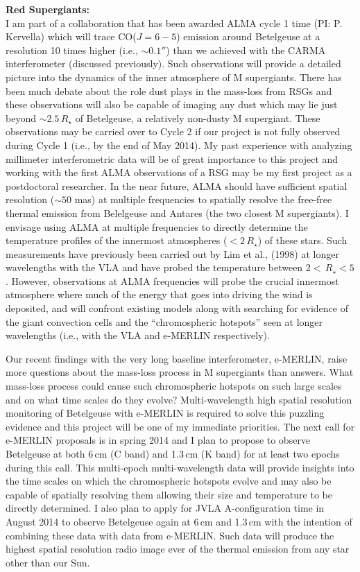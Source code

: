 \documentclass[11pt]{letter} %
\begin{document}
\textbf{Red Supergiants:}\\
I am part of a collaboration that has been awarded ALMA cycle 1 time (PI: P. Kervella) which will trace CO($J=6-5$) emission around Betelgeuse at a resolution 10 times higher (i.e., $\sim 0.1''$) than we achieved with the CARMA interferometer (discussed previously). Such observations will provide a detailed picture into the dynamics of the inner atmosphere of M supergiants. There has been much debate about the role dust plays in the mass-loss from RSGs and these observations will also be capable of imaging any dust which may lie just beyond $\sim 2.5\,R_{\star}$ of Betelgeuse, a relatively non-dusty M supergiant. These observations may be carried over to Cycle 2 if our project is not fully observed during Cycle 1 (i.e., by the end of May 2014). My past experience with analyzing millimeter interferometric data will be of great importance to this project and working with the first ALMA observations of a RSG may be my first project as a postdoctoral researcher. In the near future, ALMA should have sufficient spatial resolution ($\sim 50$ mas) at multiple frequencies to spatially resolve the free-free thermal emission from Belelgeuse and Antares (the two closest M supergiants). I envisage using ALMA at multiple frequencies to directly determine the temperature profiles of the  innermost atmospheres ($<2\,R_{\star}$) of these stars. Such measurements have previously been carried out by Lim et al., (1998) at longer wavelengths with the VLA and have probed the temperature between $2 < \,R_{\star} < 5$. However, observations at ALMA frequencies will probe the crucial innermost atmosphere where much of the energy that goes into driving the wind is deposited, and will confront existing models along with searching for evidence of the giant convection cells and the ``chromospheric hotspots'' seen at longer wavelengths (i.e., with the VLA and e-MERLIN respectively).

Our recent findings with the very long baseline interferometer, e-MERLIN, raise more questions about the mass-loss process in M supergiants than answers. What mass-loss process could cause such chromospheric hotspots on such large scales and on what time scales do they evolve? Multi-wavelength high spatial resolution monitoring of Betelgeuse with e-MERLIN is required to solve this puzzling evidence and this project will be one of my immediate priorities. The next call for e-MERLIN proposals is in spring 2014 and I plan to propose to observe Betelgeuse at both 6\,cm (C band) and 1.3\,cm (K band) for at least two epochs during this call. This multi-epoch multi-wavelength data will provide insights into the time scales on which the chromospheric hotspots evolve and may also be capable of spatially resolving them allowing their size and temperature to be directly determined. I also plan to apply for JVLA A-configuration time in August 2014 to observe Betelgeuse again at 6\,cm and 1.3\,cm with the intention of combining these data with data from e-MERLIN. Such data will produce the highest spatial resolution radio image ever of the thermal emission from any star other than our Sun. 
\end{document}
